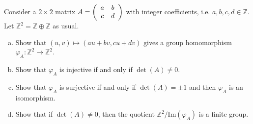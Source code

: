 \documentclass{article}
\newcounter{Problem}
\newenvironment{Problem}{\begin{Exercise}[name={Problem},
                                          counter={Problem}]}
                        {\end{Exercise}}
\begin{document}
\begin{Problem}
Consider a $2 \times 2$ matrix
$A = \left(\begin{array}{c c}
       a & b \\ c & d
     \end{array}\right)$
with integer coefficients, i.e.
$a, b, c, d \in \mathbb{Z}$. Let
$\mathbb{Z}^2 = \mathbb{Z} \oplus \mathbb{Z}$ as usual.
\begin{enumerate}[(a)]
  \item{
    Show that $(u, v) \mapsto (au + bv, cu + dv)$ gives a group
    homomorphism $\varphi_A : \mathbb{Z}^2 \to \mathbb{Z}^2$.
  }
  \item{
    Show that $\varphi_A$ is injective if and only if
    $\det(A) \neq 0$.
  }
  \item{
    Show that $\varphi_A$ is surjective if and only if
    $\det(A) = \pm 1$ and then $\varphi_A$ is an isomorphism.
  }
  \item{
    Show that if $\det(A) \neq 0$, then the quotient
    $\mathbb{Z}^2 / \mathrm{Im}(\varphi_A)$ is a finite group.
  }
\end{enumerate}
\end{Problem}
\end{document}
